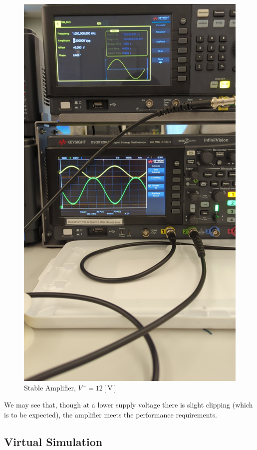 \documentclass[
	letterpaper, %
	10pt, %
]{CSUniSchoolLabReport}
\begin{document}
\begin{figure}[H]
  \centering
  \includegraphics[width=.9\textwidth]{Figures/L4F5}
  \caption{Stable Amplifier, $V^{+}=12[\si{\volt}]$}
  \label{fig:7}
\end{figure}

We may see that, though at a lower supply voltage there is slight clipping (which is to be expected), the amplifier meets the performance requirements.

\subsection{Virtual Simulation}
\end{document}

